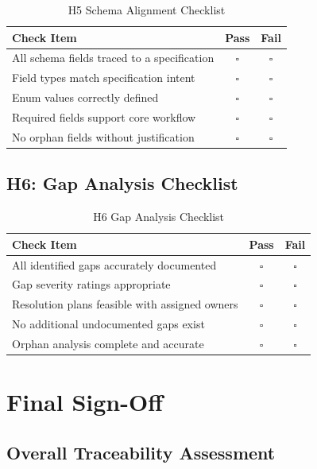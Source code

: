 \documentclass[11pt,a4paper,twoside]{report}
\begin{document}
\begin{table}[h]
\centering
\caption{H5 Schema Alignment Checklist}
\begin{tabular}{@{}L{10cm}cc@{}}
\toprule
\textbf{Check Item} & \textbf{Pass} & \textbf{Fail} \\
\midrule
All schema fields traced to a specification & $\square$ & $\square$ \\
Field types match specification intent & $\square$ & $\square$ \\
Enum values correctly defined & $\square$ & $\square$ \\
Required fields support core workflow & $\square$ & $\square$ \\
No orphan fields without justification & $\square$ & $\square$ \\
\bottomrule
\end{tabular}
\end{table}

\subsection{H6: Gap Analysis Checklist}

\begin{table}[h]
\centering
\caption{H6 Gap Analysis Checklist}
\begin{tabular}{@{}L{10cm}cc@{}}
\toprule
\textbf{Check Item} & \textbf{Pass} & \textbf{Fail} \\
\midrule
All identified gaps accurately documented & $\square$ & $\square$ \\
Gap severity ratings appropriate & $\square$ & $\square$ \\
Resolution plans feasible with assigned owners & $\square$ & $\square$ \\
No additional undocumented gaps exist & $\square$ & $\square$ \\
Orphan analysis complete and accurate & $\square$ & $\square$ \\
\bottomrule
\end{tabular}
\end{table}

\section{Final Sign-Off}
\label{sec:final-signoff}

\subsection{Overall Traceability Assessment}
\end{document}
